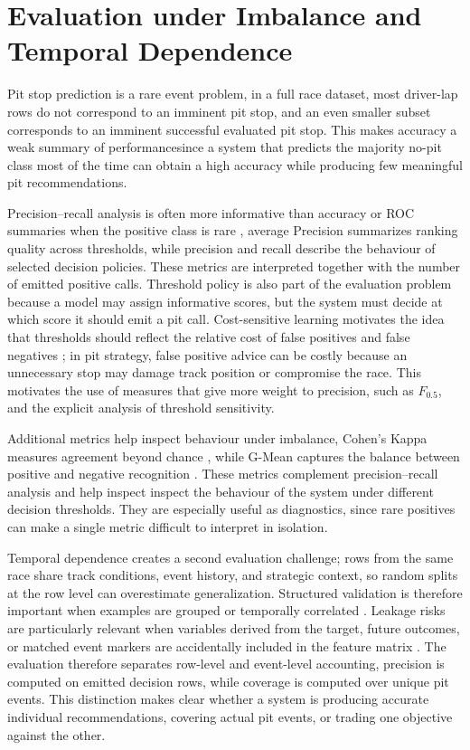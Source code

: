 \section{Evaluation under Imbalance and Temporal Dependence}

Pit stop prediction is a rare event problem, in a full race dataset, most driver-lap rows do not correspond to an imminent pit stop, and an even smaller subset
corresponds to an imminent successful evaluated pit stop. This makes accuracy a weak summary of performancesince a system that predicts the majority no-pit class most of
the time can obtain a high accuracy while producing few meaningful pit recommendations.

Precision--recall analysis is often more informative than accuracy or ROC summaries when the positive class is rare \citep{saito2015prroc,davis2006relationship},
average Precision summarizes ranking quality across thresholds, while precision and recall describe the behaviour of selected decision policies.
These metrics are interpreted together with the number of emitted positive calls.
Threshold policy is also part of the evaluation problem because a model may assign informative scores, but the system must decide at which score it should emit a pit call.
Cost-sensitive learning motivates the idea that thresholds should reflect the relative cost of false positives and false negatives \citep{elkan2001costsensitive};
in pit strategy, false positive advice can be costly because an unnecessary stop may damage track position or compromise the race. This motivates the use of measures that give
more weight to precision, such as $F_{0.5}$, and the explicit analysis of threshold sensitivity.

Additional metrics help inspect behaviour under imbalance, Cohen's Kappa measures agreement beyond chance \citep{cohen1960kappa}, while G-Mean captures
the balance between positive and negative recognition \citep{he2009imbalanced}. These metrics complement precision--recall analysis and help inspect
inspect the behaviour of the system under different decision thresholds. They are especially useful as diagnostics, since rare positives can make a single metric difficult
to interpret in isolation.

Temporal dependence creates a second evaluation challenge; rows from the same race share track conditions, event history, and strategic context,
so random splits at the row level can overestimate generalization. Structured validation is therefore important when examples are grouped or temporally correlated
\citep{roberts2017cvstructured}. Leakage risks are particularly relevant when variables derived from the target, future outcomes, or matched event markers are accidentally
included in the feature matrix \citep{brookshire2024leakage}.
The evaluation therefore separates row-level and event-level accounting, precision is computed on emitted decision rows, while coverage is computed over unique
pit events. This distinction makes clear whether a system is producing accurate individual recommendations, covering actual pit events, or trading one objective against the other.


